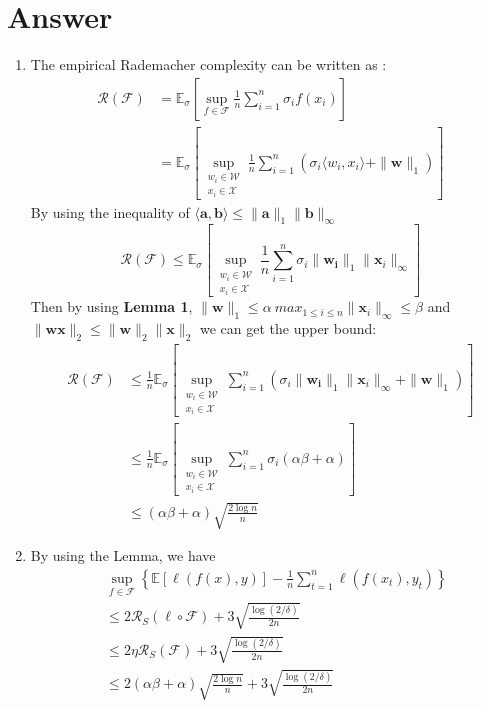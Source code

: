 \documentclass[
	12pt, %
]{fphw}
\begin{document}
\section*{Answer}
\begin{enumerate}
	\item The empirical Rademacher complexity can be written as :
	\begin{equation*}
		\begin{aligned}
			\mathcal{R}(\mathcal{F}) & ={\mathbb{E}_{\sigma}}\left[\sup_{f\in\mathcal{F}}\frac1n\sum_{i=1}^n\sigma_i f(x_i)\right] \\
									 & ={\mathbb{E}_{\sigma}}\left[\sup_{\substack{w_i\in\mathcal{W}\\x_i\in\mathcal{X}}}\frac1n\sum_{i=1}^n(\sigma_i \langle w_i, x_i \rangle + \|\mathbf{w}\|_1) \right]
		\end{aligned}	
	\end{equation*}
	By using the inequality of $\langle\mathbf{a},\mathbf{b}\rangle\leq\|\mathbf{a}\|_1\|\mathbf{b}\|_\infty$
	\begin{equation*}
		\mathcal{R}(\mathcal{F})  \leq {\mathbb{E}_{\sigma}}\left[\sup_{\substack{w_i\in\mathcal{W}\\x_i\in\mathcal{X}}}\frac1n\sum_{i=1}^n\sigma_i \|\mathbf{w_i}\|_1 \|\mathbf{x} _i\|_\infty\right]								 
	\end{equation*}
	Then by using \textbf{Lemma 1},  $\|\mathbf{w}\|_1\leq\alpha\ max_{1\leq i\leq n}\|\mathbf{x} _i\|_\infty\leq \beta $ and $\|\mathbf{w x}\|_2 \leq \|\mathbf{w}\|_2\|\mathbf{x}\|_2$ we can get the upper bound:
	\begin{equation*}
		\begin{aligned}
		\mathcal{R}(\mathcal{F}) & \leq \frac1n{\mathbb{E}_{\sigma}}\left[\sup_{\substack{w_i\in\mathcal{W}\\x_i\in\mathcal{X}}}\sum_{i=1}^n(\sigma_i \|\mathbf{w_i}\|_1 \|\mathbf{x} _i\|_\infty+\|\mathbf{w}\|_1)\right]	\\	
								 &\leq \frac1n{\mathbb{E}_{\sigma}}\left[\sup_{\substack{w_i\in\mathcal{W}\\x_i\in\mathcal{X}}}\sum_{i=1}^n\sigma_i (\alpha \beta + \alpha) \right]	\\
								 & \leq (\alpha \beta +\alpha) \sqrt{\frac{2\log n}{n}}
	\end{aligned}
	\end{equation*}
	\item By using the Lemma, we have
	\begin{equation*}
		\begin{aligned}
			&\sup_{f\in\mathcal{F}}\left\{\mathbb{E}[\ell(f(x),y)]-\frac1n\sum_{t=1}^n\ell\left(f\left(x_t\right),y_t\right)\right\} \\
			&\leq2\mathcal{R}_S(\ell\circ\mathcal{F})+3\sqrt{\frac{\log(2/\delta)}{2n}}\\
			&\leq2\eta\mathcal{R}_S(\mathcal{F})+3\sqrt{\frac{\log(2/\delta)}{2n}} \\
			&\leq2(\alpha \beta +\alpha) \sqrt{\frac{2\log n}{n}}+3\sqrt{\frac{\log(2/\delta)}{2n}}
			\end{aligned}
	\end{equation*} 
\end{enumerate}





\end{document}
